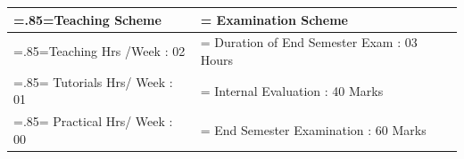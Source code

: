 \documentclass[12pt, a4paper]{article}
\begin{document}
\begin{center}
\begin{tabularx}{\textwidth}{|>{\hsize=.85\hsize\linewidth=\hsize}X|>{\hsize=1.15\hsize\linewidth=\hsize}X|}
                                                                                                                        Teaching Scheme & Examination Scheme \\
                                                                                                                                \hline
                                                                                                                                        Teaching Hrs /Week : 02 & Duration of End Semester Exam : 03 Hours \\
                                                                                                                                                \hline
                                                                                                                                                        Tutorials Hrs/ Week : 01 & Internal Evaluation \hspace{2.4cm}: 40 Marks \\
                                                                                                                                                                \hline
                                                                                                                                                                        Practical Hrs/ Week : 00 & End Semester Examination \hspace{1cm}: 60 Marks \\
                                                                                                                                                                                \hline
                                                                                                                                                                                    \end{tabularx}
                                                                                                                                                                                  
                                                                                                                                                                                                                                                                                                                                                                                                                                                                                                                                                \end{center}
\end{document}
